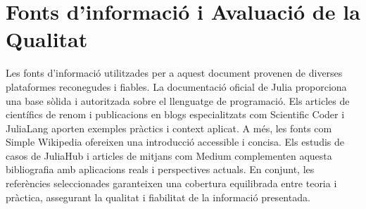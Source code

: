 \documentclass[a4paper]{article}
\begin{document}
\section{Fonts d'informació i Avaluació de la Qualitat}

Les fonts d'informació utilitzades per a aquest document provenen de diverses plataformes reconegudes i fiables.
La documentació oficial de Julia proporciona una base sòlida i autoritzada sobre el llenguatge de programació.
Els articles de científics de renom i publicacions en blogs especialitzats com Scientific Coder i JuliaLang aporten exemples pràctics i context aplicat.
A més, les fonts com Simple Wikipedia ofereixen una introducció accessible i concisa.
Els estudis de casos de JuliaHub i articles de mitjans com Medium complementen aquesta bibliografia amb aplicacions reals i perspectives actuals.
En conjunt, les referències seleccionades garanteixen una cobertura equilibrada entre teoria i pràctica, assegurant la qualitat i fiabilitat de la informació presentada.

\newpage
\end{document}
